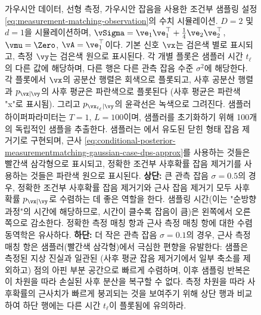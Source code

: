 \documentclass[../../book-main_ko.tex]{subfiles}
\begin{document}
\begin{example}
\begin{figure}[tbp]
    \caption{가우시안 데이터, 선형 측정, 가우시안 잡음을 사용한 조건부 샘플링 설정 \eqref{eq:measurement-matching-observation}의 수치 시뮬레이션. $D=2$ 및 $d=1$을 시뮬레이션하며, $\vSigma = \ve_1 \ve_1^\top + \tfrac{1}{4} \ve_2 \ve_2^\top$, $\vmu = \Zero$, $\vA = \ve_1^\top$이다. 기본 신호 $\vx$는 검은색 별로 표시되고, 측정 $\vy$는 검은색 원으로 표시된다.
    각 개별 플롯은 샘플러 시간 $t_{\ell}$의 다른 값에 해당하며, 다른 행은 다른 관측 잡음 수준 $\sigma^2$에 해당한다.
    각 플롯에서 $\vx$의 공분산 행렬은 회색으로 플롯되고, 사후 공분산 행렬과 $p_{\vx \mid \vy}$의 사후 평균은 파란색으로 플롯된다 (사후 평균은 파란색 "x"로 표시됨). 그리고 $p_{\vx_{t_{\ell}} \mid \vy}$의 윤곽선은 녹색으로 그려진다. 샘플러 하이퍼파라미터는 $T=1$, $L=100$이며, 샘플러를 초기화하기 위해 100개의 독립적인 샘플을 추출한다. 샘플러는 에서 유도된 닫힌 형태 잡음 제거기로 구현되며, 근사 \eqref{eq:conditional-posterior-measurementmatching-gaussian-case-dps-approx}를 사용하는 것들은 빨간색 삼각형으로 표시되고, 정확한 조건부 사후확률 잡음 제거기를 사용하는 것들은 파란색 원으로 표시된다.
    \textbf{상단:} 큰 관측 잡음 $\sigma = 0.5$의 경우, 정확한 조건부 사후확률 잡음 제거기와 근사 잡음 제거기 모두 사후확률 $p_{\vx \mid \vy}$로 수렴하는 데 좋은 역할을 한다. 샘플링 시간(이는 "순방향 과정"의 시간에 해당하므로, 시간이 클수록 잡음이 큼)은 왼쪽에서 오른쪽으로 감소한다. 정확한 측정 매칭 항과 근사 측정 매칭 항에 대한 수렴 동역학은 유사하다. \textbf{하단:} 더 작은 관측 잡음 $\sigma = 0.1$의 경우, 근사 측정 매칭 항은 샘플러(빨간색 삼각형)에서 극심한 편향을 유발한다: 샘플은 측정된 지상 진실과 일관된 (사후 평균 잡음 제거기에서 일부 축소를 제외하고) 점의 아핀 부분 공간으로 빠르게 수렴하며, 이후 샘플링 반복은 이 차원을 따라 손실된 사후 분산을 복구할 수 없다. 측정 차원을 따라 사후확률의 근사치가 빠르게 붕괴되는 것을 보여주기 위해 상단 행과 비교하여 하단 행에는 다른 시간 $t_{\ell}$이 플롯됨에 유의하라.
    }
    \label{fig:conditional_sampling_computational_gaussian}
  \end{figure}



\end{example}
\end{document}
